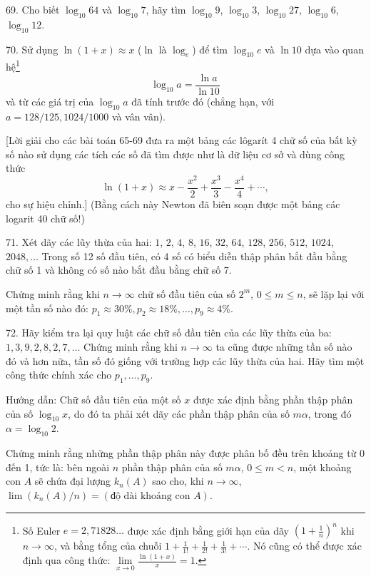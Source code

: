 \begin{problem}{69.}
	Cho biết $\log_{10} 64$ và $\log_{10} 7$, hãy tìm $\log_{10} 9$, $\log_{10} 3$, $\log_{10} 27$, $\log_{10} 6$, $\log_{10} 12$.
\end{problem}

\begin{problem}{70.}
	Sử dụng $\ln(1+x)\approx x$ ($\ln$ là $\log_e$) để tìm $\log_{10} e$ và $\ln 10$ dựa vào quan hệ\footnote{Số Euler $e=2,71828\dots$ được xác định bằng giới hạn của dãy $\left(1+\frac{1}{n}\right)^n$ khi $n\to \infty$, và bằng tổng của chuỗi $1+\frac{1}{1!}+\frac{1}{2!}+\frac{1}{3!}+\dotsb$. Nó cũng có thể được xác định qua công thức: $\lim\limits_{x\to 0}\frac{\ln(1+x)}{x} = 1$.}
	\begin{equation*}
		\log_{10} a=\frac{\ln a}{\ln 10}
	\end{equation*}
	và từ các giá trị của $\log_{10} a$ đã tính trước đó (chẳng hạn, với $a=128/125, 1024/1000$ và vân vân).

	[Lời giải cho các bài toán 65-69 đưa ra một bảng các lôgarít 4 chữ số của bất kỳ số nào sử dụng các tích các số đã tìm được như là dữ liệu cơ sở và dùng công thức
	\begin{equation*}
		\ln (1+x) \approx x-\frac{x^2}{2}+\frac{x^3}{3}-\frac{x^4}{4}+\dotsb,
	\end{equation*}
	cho sự hiệu chỉnh.] (Bằng cách này Newton đã biên soạn được một bảng các logarit 40 chữ số!)
\end{problem}

\begin{problem}{71.}
	Xét dãy các lũy thừa của hai: $1$, $2$, $4$, $8$, $16$, $32$, $64$, $128$, $256$, $512$, $1024$, $2048, \dotsc$ Trong số 12 số đầu tiên, có 4 số có biểu diễn thập phân bắt đầu bằng chữ số 1 và không có số nào bắt đầu bằng chữ số 7.

	Chứng minh rằng khi $n\to \infty$ chữ số đầu tiên của số $2^m$, $0\leqslant m\leqslant n$, sẽ lặp lại với một tần số nào đó:
	$p_1 \approx 30\%, p_2 \approx 18\%, \dotsc, p_9 \approx 4\%$.
\end{problem}

\begin{problem}{72.}
	Hãy kiểm tra lại quy luật các chữ số đầu tiên của các lũy thừa của ba: $1,
	3, 9, 2, 8, 2, 7, \dotsc$ Chứng minh rằng khi $n\rightarrow \infty$ ta cũng được những tần số nào đó và hơn nữa, tần số đó giống với trường hợp các lũy thừa của hai. Hãy tìm một công thức chính xác cho $p_1, \dotsc, p_9$.

	\begin{note}{Hướng dẫn:}
		Chữ số đầu tiên của một số $x$ được xác định bằng phần thập phân của số $\log_{10} x$, do đó ta phải xét dãy các phần thập phân của số $m \alpha$, trong đó $\alpha=\log_{10} 2$.
	\end{note}
	Chứng minh rằng những phần thập phân này được phân bố đều trên khoảng từ 0 đến 1, tức là: bên ngoài $n$ phần thập phân của số $m \alpha$, $0\leqslant m<n$, một khoảng con $A$ sẽ chứa đại lượng $k_n(A)$ sao cho, khi $n \to \infty$, $\lim(k_n(A)/n)=(\text{độ dài khoảng con $A$})$.
\end{problem}

